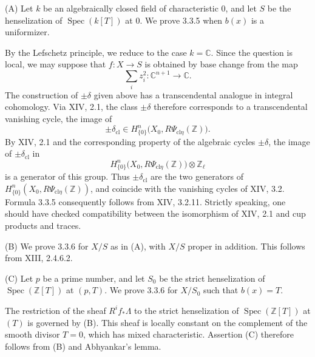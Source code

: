 \medskip
\noindent\textup{(A)}
Let $k$ be an algebraically closed field of characteristic $0$, and
let $S$ be the henselization of $\operatorname{Spec}(k[T])$ at $0$.
We prove 3.3.5 when $b(x)$ is a uniformizer.

By the Lefschetz principle, we reduce to the case $k=\mathbb C$.
Since the question is local, we may suppose that $f:X\to S$ is
obtained by base change from the map
\[
\sum_i z_i^2:\mathbb C^{n+1}\longrightarrow\mathbb C.
\]
The construction of $\pm\delta$ given above has a transcendental
analogue in integral cohomology.  Via XIV, 2.1, the class
$\pm\delta$ therefore corresponds to a transcendental vanishing
cycle, the image of
\[
\pm\delta_{\mathrm{cl}}
\in H^n_{\{0\}}\bigl(X_0,R\Psi_{\mathrm{cl}\eta}(\mathbb Z)\bigr).
\]
By XIV, 2.1 and the corresponding property of the algebraic cycles
$\pm\delta$, the image of $\pm\delta_{\mathrm{cl}}$ in
\[
H^n_{\{0\}}\bigl(X_0,R\Psi_{\mathrm{cl}\eta}(\mathbb Z)\bigr)
\otimes\mathbb Z_\ell
\]
is a generator of this group.  Thus $\pm\delta_{\mathrm{cl}}$ are the
two generators of
$H^n_{\{0\}}(X_0,R\Psi_{\mathrm{cl}\eta}(\mathbb Z))$, and coincide
with the vanishing cycles of XIV, 3.2.  Formula 3.3.5 consequently
follows from XIV, 3.2.11.  Strictly speaking, one should have checked
compatibility between the isomorphism of XIV, 2.1 and cup products
and traces.

\medskip
\noindent\textup{(B)}
We prove 3.3.6 for $X/S$ as in (A), with $X/S$ proper in addition.
This follows from XIII, 2.4.6.2.

\medskip
\noindent\textup{(C)}
Let $p$ be a prime number, and let $S_0$ be the strict henselization
of $\operatorname{Spec}(\mathbb Z[T])$ at $(p,T)$.  We prove 3.3.6
for $X/S_0$ such that $b(x)=T$.

The restriction of the sheaf $R^if_*\Lambda$ to the strict
henselization of $\operatorname{Spec}(\mathbb Z[T])$ at $(T)$ is
governed by (B).  This sheaf is
locally constant on the complement of the smooth divisor $T=0$,
which has mixed characteristic.  Assertion (C) therefore follows
from (B) and Abhyankar's lemma.
